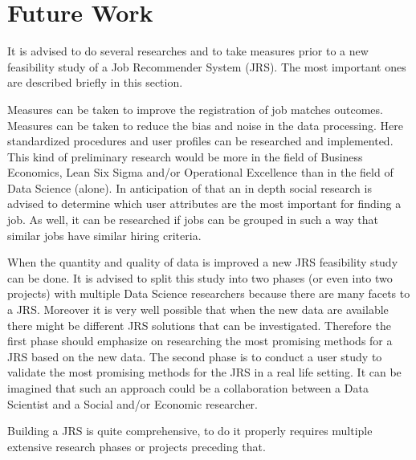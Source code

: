 \section{Future Work}
\label{sec:fut}

It is advised to do several researches and to take measures prior to a new feasibility study of a Job Recommender System (JRS).
The most important ones are described briefly in this section.

Measures can be taken to improve the registration of job matches outcomes.
Measures can be taken to reduce the bias and noise in the data processing.
Here standardized procedures and user profiles can be researched and implemented.
This kind of preliminary research would be more in the field of Business Economics, Lean Six Sigma and/or Operational Excellence than in the field of Data Science (alone).
In anticipation of that an in depth social research is advised to determine which user attributes are the most important for finding a job.
As well, it can be researched if jobs can be grouped in such a way that similar jobs have similar hiring criteria.

When the quantity and quality of data is improved a new JRS feasibility study can be done.
It is advised to split this study into two phases (or even into two  projects) with multiple Data Science researchers because there are many facets to a JRS. 
Moreover it is very well possible that when the new data are available there might be different JRS solutions that can be investigated.
Therefore the first phase should emphasize on researching the most promising methods for a JRS based on the new data.
The second phase is to conduct a user study to validate the most promising methods for the JRS in a real life setting.
It can be imagined that such an approach could be a collaboration between a Data Scientist and a Social and/or Economic researcher.  

Building a JRS is quite comprehensive, to do it properly requires multiple extensive research phases or projects preceding that.
